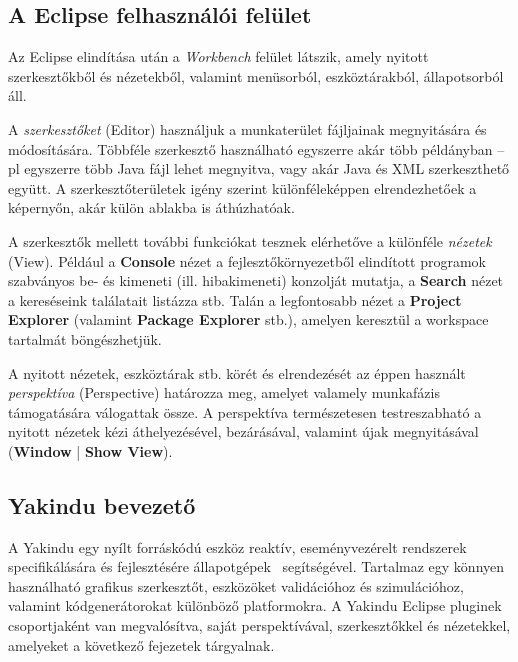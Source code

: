 \subsection{A Eclipse felhasználói felület}
\label{sec:eclipse-gui}

Az Eclipse elindítása után a \emph{Workbench} felület látszik, amely nyitott szerkesztőkből és nézetekből, valamint menüsorból, eszköztárakból, állapotsorból áll.

A \emph{szerkesztőket} (Editor) használjuk a munkaterület fájljainak megnyitására és módosítására. Többféle szerkesztő használható egyszerre akár több példányban -- pl egyszerre több Java fájl lehet megnyitva, vagy akár Java és XML szerkeszthető együtt. A szerkesztőterületek igény szerint különféleképpen elrendezhetőek a képernyőn, akár külön ablakba is áthúzhatóak.

A szerkesztők mellett további funkciókat tesznek elérhetőve a különféle \emph{nézetek} (View). Például a \textbf{Console} nézet a fejlesztőkörnyezetből elindított programok szabványos be- és kimeneti (ill. hibakimeneti) konzolját mutatja, a \textbf{Search} nézet a kereséseink találatait listázza stb. Talán a legfontosabb nézet a \textbf{Project Explorer} (valamint \textbf{Package Explorer} stb.), amelyen keresztül a workspace tartalmát böngészhetjük.

A nyitott nézetek, eszköztárak stb. körét és elrendezését az éppen használt \emph{perspektíva} (Perspective) határozza meg, amelyet valamely munkafázis támogatására válogattak össze. A perspektíva természetesen testreszabható a nyitott nézetek kézi áthelyezésével, bezárásával, valamint újak megnyitásával (\textbf{Window} | \textbf{Show View}).

\begin{comment}
A nézetek elsődleges funkciója az, hogy a navigálni lehessen az információ között. Egy nézet tulajdonképpen a Workspace adatinak egy reprezentációja. Míg a szerkesztők helye kötött, nézetek bárhová helyezhetők. Saját eszköztárral is rendelkezhetnek.
\end{comment}

\subsection{Yakindu bevezető}

A Yakindu egy nyílt forráskódú eszköz reaktív, eseményvezérelt rendszerek specifikálására és fejlesztésére állapotgépek~\cite{DBLP:journals/scp/Harel87} segítségével. Tartalmaz egy könnyen használható grafikus szerkesztőt, eszközöket validációhoz és szimulációhoz, valamint kódgenerátorokat különböző platformokra. A Yakindu Eclipse pluginek csoportjaként van megvalósítva, saját perspektívával, szerkesztőkkel és nézetekkel, amelyeket a következő fejezetek tárgyalnak.

